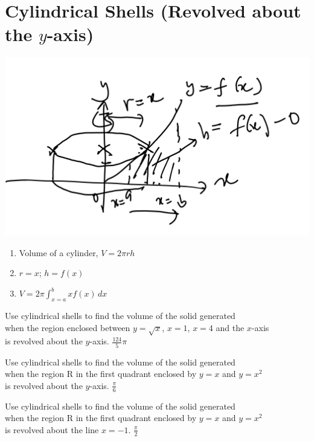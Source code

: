 
\section{Cylindrical Shells (Revolved about the $y$-axis)
}

\begin{myframe}[arc=10pt,auto outer arc]
\centering
\includegraphics[width=0.7\linewidth]{chapter5/shelly}

\begin{enumerate}
	\item Volume of a cylinder, $V = 2\pi rh$
	\item $r = x$; $h = f(x)$
	\item  $\displaystyle V = 2\pi\int_{x=a}^b x f(x) \, dx$
\end{enumerate}

\end{myframe}

\problemans%
{Use cylindrical shells to find the volume of the solid generated \\
	when the region enclosed between $y=\sqrt{x}$, $x=1$, $x=4$ and the $x$-axis \\
	is revolved about the $y$-axis.
}%
{$\displaystyle \frac{124}{5} \pi$}%

\newpage
\problemans%
{Use cylindrical shells to find the volume of the solid generated \\
	when the region R in the first quadrant enclosed by $y=x$ and $y=x^2$  \\
	is revolved about the $y$-axis. 
}%
{$\displaystyle \frac{\pi}{6}$}%


\newpage
\problemans%
{Use cylindrical shells to find the volume of the solid generated \\
	when the region R in the first quadrant enclosed by $y=x$ and $y=x^2$ \\
	is revolved about the line $x=-1$. 
}%
{$\displaystyle \frac{\pi}{2}$}%

